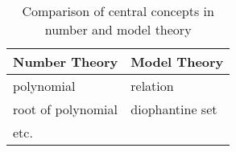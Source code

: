 

\begin{table}
    \begin{tabular}{l l}
        \toprule
        Number Theory          & Model Theory \\
        \midrule
        polynomial         & relation          \\
        root of polynomial & diophantine set   \\
        etc.               &                   \\
        \bottomrule
    \end{tabular}
    \caption{Comparison of central concepts in number and model theory}
\end{table}